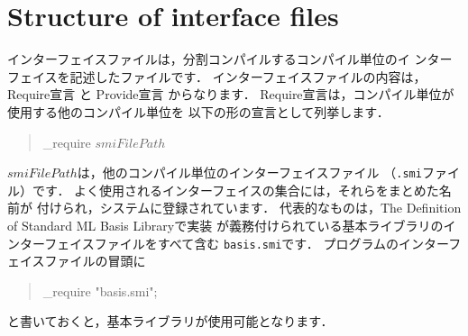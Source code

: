 \documentclass{jbook}
\newcommand{\txt}[2]{#2}
\newenvironment{program}{\begin{quote}\begin{tt}}%
                        {\end{tt}\end{quote}}
\begin{document}
\section{\txt{インターフェイスファイルの構造}{Structure of interface files}}
\label{sec:tutorialInterfaceFile}

\ifjp%
	インターフェイスファイルは，分割コンパイルするコンパイル単位のイ
ンターフェイスを記述したファイルです．
	インターフェイスファイルの内容は，
Require宣言
と
Provide宣言
からなります．
	Require宣言は，コンパイル単位が使用する他のコンパイル単位を
以下の形の宣言として列挙します．
\begin{program}
\_require $smiFilePath$
\end{program}
	$smiFilePath$は，他のコンパイル単位のインターフェイスファイル
（{\tt .smi}ファイル）です．
	よく使用されるインターフェイスの集合には，それらをまとめた名前が
付けられ，システムに登録されています．
	代表的なものは，The Definition of Standard ML Basis Libraryで実装
が義務付けられている基本ライブラリのインターフェイスファイルをすべて含む
{\tt basis.smi}です．
	プログラムのインターフェイスファイルの冒頭に
\begin{program}
\_require "basis.smi";
\end{program}
と書いておくと，基本ライブラリが使用可能となります．
\end{document}
